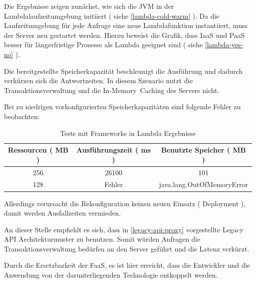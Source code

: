 \documentclass[
12pt,
english,
ngerman,
headsepline,
twoside,
openright,
numbers=noenddot,version=first
]{scrreprt}
\providecommand{\tabularnewline}{\\}
\begin{document}
Die Ergebnisse zeigen zunächst, wie sich die \acrshort{JVM} in der Lambdalaufzeitumgebung initiiert ( siehe \autoref{lambda-cold-warm} ). Da die Laufzeitumgebung für jede Anfrage eine neue Lambdafunktion instantiiert, muss der Server neu gestartet werden. Hierzu beweist die Grafik, dass \acrshort{IaaS} und \acrshort{PaaS} besser für längerfristige Prozesse als Lambda geeignet sind ( siehe \autoref{lambda-yes-no} ). 

Die bereitgestellte Speicherkapazität beschleunigt die Ausführung und dadurch verkürzen sich die Antwortzeiten. In diesem Szenario nutzt die Transaktionsverwaltung und die \glqq In-Memory\grqq\ Caching des Servers nicht.

Bei zu niedrigen vorkonfigurierten Speicherkapazitäten sind folgende Fehler zu beobachten:

\begin{table}[h]
	\centering{}
	\begin{tabular}{ccc}
		\noalign{\vskip\doublerulesep}
		Ressourcen ( MB ) & Ausführungszeit ( ms ) & Benutzte Speicher ( MB ) \tabularnewline[\doublerulesep]
		\hline
		\noalign{\vskip\doublerulesep}
		256 & 26100 & 101 \tabularnewline[\doublerulesep]
		\noalign{\vskip\doublerulesep}
		\noalign{\vskip\doublerulesep}
		128 & Fehler & java.lang.OutOfMemoryError \tabularnewline[\doublerulesep]
	\end{tabular}\label{lambda-out-of-memory}
\caption{Tests mit Frameworks in Lambda Ergebnisse}
\end{table}

Allerdings verursacht die Rekonfiguration keinen neuen Einsatz ( Deployment ), damit werden Ausfallzeiten vermieden. 

An dieser Stelle empfiehlt es sich, dass in \autoref{legacy-api-proxy} vorgestellte Legacy API Architekturmuster zu benutzen. Somit würden Anfragen die Transaktionsverwaltung bedürfen an den Server geführt und die Latenz verkürzt.

Durch die Ersetzbarkeit der \acrshort{FaaS}, es ist hier erreicht, dass die Entwickler und die Anwendung von der darunterliegenden Technologie entkoppelt werden.%
 
\end{document}
